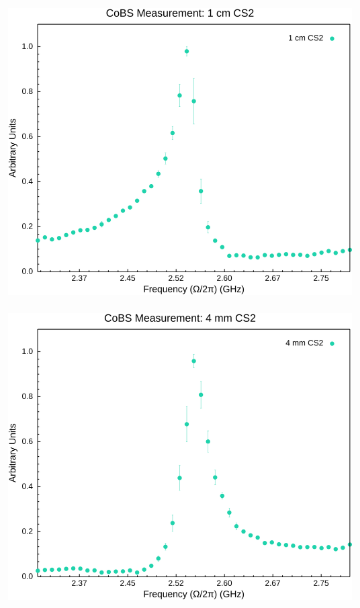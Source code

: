 \begin{figure}[h!]
  \centering
  \begin{subfigure}[b]{0.49\textwidth}
    \centering
    \hspace{-2em}
    \includegraphics[width=\textwidth]{figs/4-Raman/CoBS Measurement: 1 cm CS2.png}
    \caption{}
    \label{fig:Raman:1cmCS2}
  \end{subfigure}
  \hfill
  \begin{subfigure}[b]{0.49\textwidth}
    \centering
    \hspace{-2em}
    \includegraphics[width=\textwidth]{figs/4-Raman/CoBS Measurement: 4 mm CS2.png}

\end{subfigure}
\end{figure}
